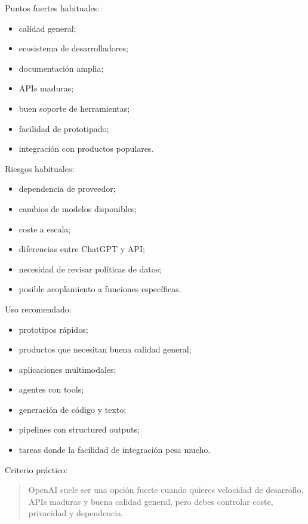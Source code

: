 Puntos fuertes habituales:

\begin{itemize}
\tightlist
\item
  calidad general;
\item
  ecosistema de desarrolladores;
\item
  documentación amplia;
\item
  APIs maduras;
\item
  buen soporte de herramientas;
\item
  facilidad de prototipado;
\item
  integración con productos populares.
\end{itemize}

Riesgos habituales:

\begin{itemize}
\tightlist
\item
  dependencia de proveedor;
\item
  cambios de modelos disponibles;
\item
  coste a escala;
\item
  diferencias entre ChatGPT y API;
\item
  necesidad de revisar políticas de datos;
\item
  posible acoplamiento a funciones específicas.
\end{itemize}

Uso recomendado:

\begin{itemize}
\tightlist
\item
  prototipos rápidos;
\item
  productos que necesitan buena calidad general;
\item
  aplicaciones multimodales;
\item
  agentes con tools;
\item
  generación de código y texto;
\item
  pipelines con structured outputs;
\item
  tareas donde la facilidad de integración pesa mucho.
\end{itemize}

Criterio práctico:

\begin{quote}
OpenAI suele ser una opción fuerte cuando quieres velocidad de
desarrollo, APIs maduras y buena calidad general, pero debes controlar
coste, privacidad y dependencia.
\end{quote}

